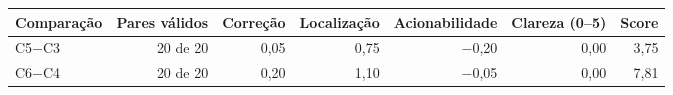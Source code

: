 \begin{tabular}{|l|r|r|r|r|r|r|}
\hline
\textbf{Comparação} & \textbf{Pares válidos} & \textbf{Correção} & \textbf{Localização} & \textbf{Acionabilidade} & \textbf{Clareza (0--5)} & \textbf{Score} \\
\hline
C5$-$C3 & 20 de 20 & 0,05 & 0,75 & $-$0,20 & 0,00 & 3,75 \\
\hline
C6$-$C4 & 20 de 20 & 0,20 & 1,10 & $-$0,05 & 0,00 & 7,81 \\
\hline
\end{tabular}
